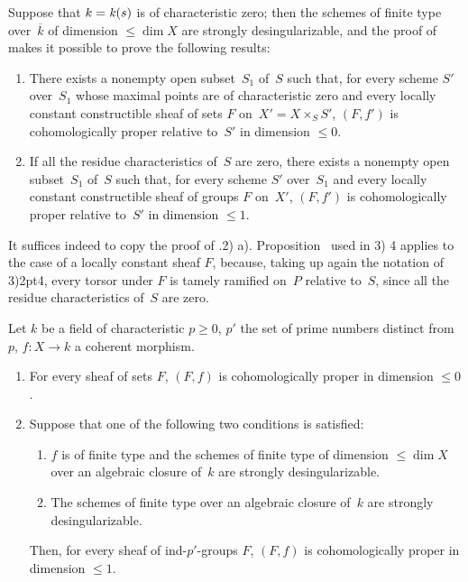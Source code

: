 \begin{subremark}
\label{XIII.3.1.3}
Suppose
that $k=\mathit{k}(s)$ is of characteristic zero; then the
schemes of finite type over~$\overline{k}$ of dimension $\leq\dim X$
are strongly desingularizable, and the proof
of~ makes it possible to prove the following results:
\begin{enumerate}
\item[a)] There exists a nonempty open subset~$S_1$ of~$S$ such that, for every
scheme $S'$ over~$S_1$ whose maximal points are of
characteristic zero and every locally
constant constructible sheaf of sets $F$ on~$X'=X\times_SS'$, $(F,f')$ is
cohomologically proper relative to~$S'$ in dimension $\leq
0$.

\item[b)] If all the residue characteristics of~$S$ are
zero, there exists a nonempty open subset~$S_1$ of~$S$ such that, for every
scheme $S'$ over~$S_1$ and every locally constant
constructible sheaf of groups $F$ on~$X'$, $(F,f')$ is
cohomologically proper relative to~$S'$ in dimension $\leq1$.
\end{enumerate}

It suffices indeed to copy the proof of
.2)\kern2pt a). Proposition~ used in
3)\kern2pt 4 applies to the case of a locally constant sheaf $F$, because,
taking up again the notation of 3)\kern2pt4, every torsor under $F$ is
tamely ramified on~$P$ relative to~$S$, since
all the residue characteristics of~$S$ are zero.
\end{subremark}

\begin{corollary}
\label{XIII.3.2}
Let $k$ be a field of characteristic $p\geq 0$, $p'$ the set
of prime numbers distinct from~$p$, $f\colon X\to k$ a coherent
morphism.
\begin{enumerate}
\item[1)] For every sheaf of sets $F$, $(F,f)$ is
cohomologically proper in dimension $\leq 0$.
\item[2)] Suppose that one of the following two conditions is satisfied:
\begin{enumerate}
\item[a)] $f$ is of finite type and the schemes of finite type of
dimension $\leq\dim X$ over an algebraic closure of~$k$ are
strongly de\-sin\-gu\-lar\-iz\-able.
\item[b)] The schemes of finite type over an algebraic
closure of~$k$ are
strongly desingularizable.
\end{enumerate}
Then, for every sheaf of ind-$p'$-groups $F$, $(F,f)$ is
cohomologically proper in dimension $\leq 1$.
\end{enumerate}
\end{corollary}

